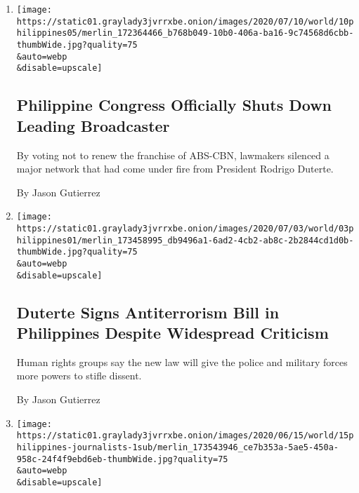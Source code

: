 \begin{enumerate}
\def\labelenumi{\arabic{enumi}.}
\item
  \href{/2020/07/10/world/asia/philippines-congress-media-duterte-abs-cbn.html}{}

  \texttt{[image: https://static01.graylady3jvrrxbe.onion/images/2020/07/10/world/10philippines05/merlin\_172364466\_b768b049-10b0-406a-ba16-9c74568d6cbb-thumbWide.jpg?quality=75\\\&auto=webp\\\&disable=upscale]}

  \hypertarget{philippine-congress-officially-shuts-down-leading-broadcaster}{%
  \subsection{Philippine Congress Officially Shuts Down Leading
  Broadcaster}\label{philippine-congress-officially-shuts-down-leading-broadcaster}}

  By voting not to renew the franchise of ABS-CBN, lawmakers silenced a
  major network that had come under fire from President Rodrigo Duterte.

  By Jason Gutierrez
\item
  \href{/2020/07/03/world/asia/duterte-antiterrorism-law-philippines.html}{}

  \texttt{[image: https://static01.graylady3jvrrxbe.onion/images/2020/07/03/world/03philippines01/merlin\_173458995\_db9496a1-6ad2-4cb2-ab8c-2b2844cd1d0b-thumbWide.jpg?quality=75\\\&auto=webp\\\&disable=upscale]}

  \hypertarget{duterte-signs-antiterrorism-bill-in-philippines-despite-widespread-criticism}{%
  \subsection{Duterte Signs Antiterrorism Bill in Philippines Despite
  Widespread
  Criticism}\label{duterte-signs-antiterrorism-bill-in-philippines-despite-widespread-criticism}}

  Human rights groups say the new law will give the police and military
  forces more powers to stifle dissent.

  By Jason Gutierrez
\item
  \href{/2020/06/14/business/maria-ressa-verdict-philippines-rappler.html}{}

  \texttt{[image: https://static01.graylady3jvrrxbe.onion/images/2020/06/15/world/15philippines-journalists-1sub/merlin\_173543946\_ce7b353a-5ae5-450a-958c-24f4f9ebd6eb-thumbWide.jpg?quality=75\\\&auto=webp\\\&disable=upscale]}


\end{enumerate}
